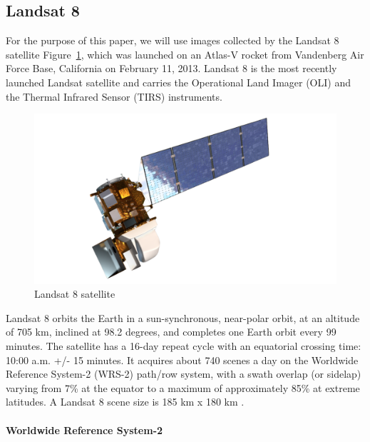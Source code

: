\documentclass[11pt, a4paper]{report}
\begin{document}
	\subsection{Landsat 8}
	\label{seq:landsat8_section}

	For the purpose of this paper, we will use images collected by the Landsat 8 satellite Figure~\ref{fig:landsat_satellite}, which was launched on an Atlas-V rocket from Vandenberg Air Force Base, California on February 11, 2013. Landsat 8 is the most recently launched Landsat satellite and carries the Operational Land Imager (OLI) and the Thermal Infrared Sensor (TIRS) instruments.
	\begin{figure}[h]
		\centering
		\includegraphics[scale=0.25]{../images/LandsatSatellite.png}
		\caption{Landsat 8 satellite \cite{LANDSATPIC}}
		\label{fig:landsat_satellite}
	\end{figure}
	Landsat 8 orbits the Earth in a sun-synchronous, near-polar orbit, at an altitude of 705 km, inclined at 98.2 degrees, and completes one Earth orbit every 99 minutes.  The satellite has a 16-day repeat cycle with an equatorial crossing time: 10:00 a.m. +/- 15 minutes. It acquires about 740 scenes a day on the Worldwide Reference System-2 (WRS-2) path/row system, with a swath overlap (or sidelap) varying from 7\% at the equator to a maximum of approximately 85\% at extreme latitudes. A Landsat 8 scene size is 185 km x 180 km \cite{LANDSAT}.
	
	\paragraph{Worldwide Reference System-2}
	\label{par:wrs-2}
	
\end{document}
